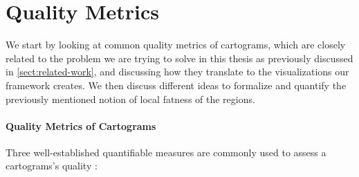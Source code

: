\section{Quality Metrics}
\label{sect:quality-metrics}

We start by looking at common quality metrics of cartograms, which are closely related to the problem we are trying to solve in this thesis as previously discussed in \cref{sect:related-work}, and discussing how they translate to the visualizations our framework creates.
We then discuss different ideas to formalize and quantify the previously mentioned notion of local fatness of the regions.



\paragraph{Quality Metrics of Cartograms}

Three well-established quantifiable measures are commonly used to assess a cartograms's quality \cite{alam2015quantitative} \cite{nusrat2018evaluating}:


